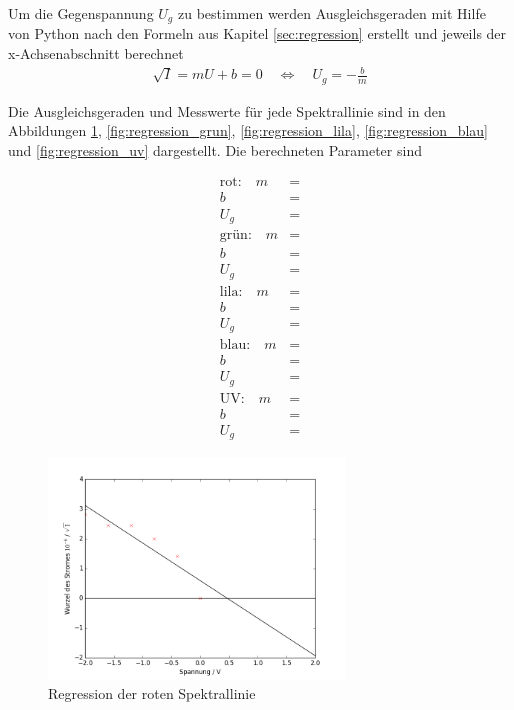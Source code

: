 \clearpage
Um die Gegenspannung $U_g$ zu bestimmen werden Ausgleichsgeraden mit Hilfe von Python nach den Formeln aus Kapitel \ref{sec:regression} erstellt und jeweils der x-Achsenabschnitt berechnet
\begin{align}
	\sqrt{I} = mU +b = 0\quad  \Leftrightarrow 	\quad U_g = - \frac{b}{m}
\end{align}	

Die Ausgleichsgeraden und Messwerte für jede Spektrallinie sind in den Abbildungen \ref{fig:regression_rot}, \ref{fig:regression_grun}, \ref{fig:regression_lila}, \ref{fig:regression_blau} und \ref{fig:regression_uv} dargestellt. Die berechneten Parameter sind

\begin{align*}
	\text{rot:} \quad m &=  \\
	b &=  \\
	U_g &=  \\[1em]
	\text{grün:} \quad m &=  \\
	b &=  \\
	U_g &=  \\[1em]
	\text{lila:} \quad m &=  \\
	b &=  \\
	U_g &=  \\[1em]
	\text{blau:} \quad m &=  \\
	b &=  \\
	U_g &=  \\[1em]
	\text{UV:} \quad m &=  \\
	b &=  \\
	U_g &= 
\end{align*}












\begin{figure}[h!]
	\centering
	\includegraphics[width=0.7\textwidth]{build/regression_Farbe:0.png}
	\caption{Regression der roten Spektrallinie}
	\label{fig:regression_rot}
\end{figure}

